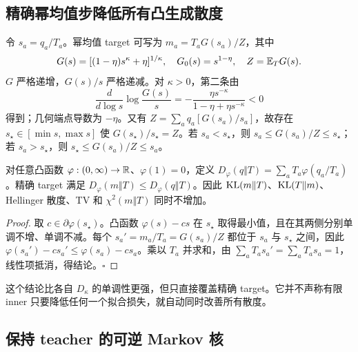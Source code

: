 \subsection{精确幂均值步降低所有凸生成散度}

令 $s_a=q_a/T_a$。幂均值 target 可写为 $m_a=T_aG(s_a)/Z$，其中
\begin{equation}
 G(s)=[(1-\eta)s^\kappa+\eta]^{1/\kappa},\quad
 G_0(s)=s^{1-\eta},\quad Z=\mathbb E_TG(s).
\end{equation}
$G$ 严格递增，$G(s)/s$ 严格递减。对 $\kappa>0$，第二条由
\begin{equation}
 \frac{d}{d\log s}\log\frac{G(s)}s
 =-\frac{\eta s^{-\kappa}}{1-\eta+\eta s^{-\kappa}}<0
\end{equation}
得到；几何端点导数为 $-\eta$。又有 $Z=\sum_aq_a[G(s_a)/s_a]$，故存在 $s_\star\in[\min s,\max s]$ 使 $G(s_\star)/s_\star=Z$。若 $s_a<s_\star$，则 $s_a\le G(s_a)/Z\le s_\star$；若 $s_a>s_\star$，则 $s_\star\le G(s_a)/Z\le s_a$。

\begin{theorem}[单教师的凸生成散度单调性]
\label{thm:proximal-all-f-divergences}
对任意凸函数 $\varphi:(0,\infty)\to\mathbb R$、$\varphi(1)=0$，定义 $D_\varphi(q\Vert T)=\sum_aT_a\varphi(q_a/T_a)$。精确 target 满足 $D_\varphi(m\Vert T)\le D_\varphi(q\Vert T)$。因此 $\operatorname{KL}(m\Vert T)$、$\operatorname{KL}(T\Vert m)$、Hellinger 散度、TV 和 $\chi^2(m\Vert T)$ 同时不增加。
\end{theorem}

\begin{proof}
取 $c\in\partial\varphi(s_\star)$。凸函数 $\varphi(s)-cs$ 在 $s_\star$ 取得最小值，且在其两侧分别单调不增、单调不减。每个 $s_a'=m_a/T_a=G(s_a)/Z$ 都位于 $s_a$ 与 $s_\star$ 之间，因此 $\varphi(s_a')-cs_a'\le\varphi(s_a)-cs_a$。乘以 $T_a$ 并求和，由 $\sum_aT_as_a'=\sum_aT_as_a=1$，线性项抵消，得结论。\hfill$\square$
\end{proof}

这个结论比各自 $D_\kappa$ 的单调性更强，但只直接覆盖精确 target。它并不声称有限 inner 只要降低任何一个拟合损失，就自动同时改善所有散度。
\subsection{保持 teacher 的可逆 Markov 核}

